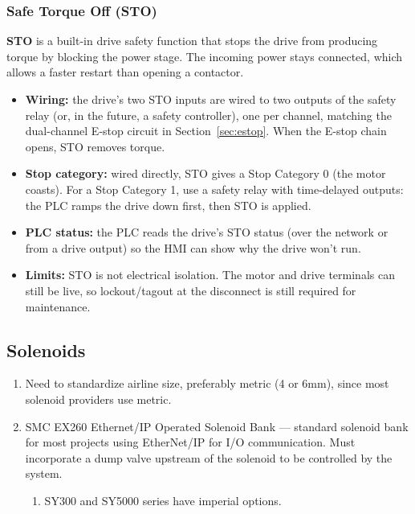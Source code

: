 \subsubsection*{Safe Torque Off (STO)}
\textbf{STO} is a built-in drive safety function that stops the drive from producing torque by blocking the power stage. The incoming power stays connected, which allows a faster restart than opening a contactor.
\begin{itemize}[itemsep=2pt]
  \item \textbf{Wiring:} the drive's two STO inputs are wired to two outputs of the safety relay (or, in the future, a safety controller), one per channel, matching the dual-channel E-stop circuit in Section~\ref{sec:estop}. When the E-stop chain opens, STO removes torque.
  \item \textbf{Stop category:} wired directly, STO gives a Stop Category 0 (the motor coasts). For a Stop Category 1, use a safety relay with time-delayed outputs: the PLC ramps the drive down first, then STO is applied.
  \item \textbf{PLC status:} the PLC reads the drive's STO status (over the network or from a drive output) so the HMI can show why the drive won't run.
  \item \textbf{Limits:} STO is not electrical isolation. The motor and drive terminals can still be live, so lockout/tagout at the disconnect is still required for maintenance.
\end{itemize}

\subsection{Solenoids}
\begin{enumerate}[itemsep=2pt]
  \item Need to standardize airline size, preferably metric (4 or 6mm), since most solenoid providers use metric.
  \item SMC EX260 Ethernet/IP Operated Solenoid Bank --- standard solenoid bank for most projects using EtherNet/IP for I/O communication. Must incorporate a dump valve upstream of the solenoid to be controlled by the system.
  \begin{enumerate}
    \item SY300 and SY5000 series have imperial options.
  \end{enumerate}
\end{enumerate}

